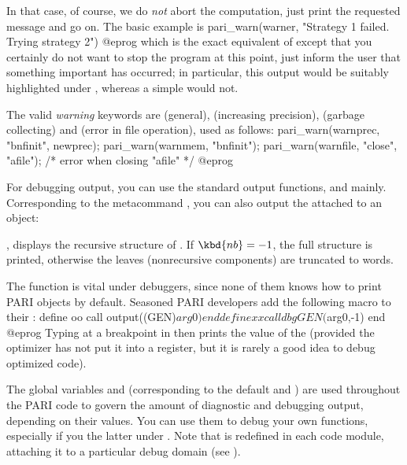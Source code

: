 In that case, of course, we do \emph{not} abort the computation, just print
the requested message and go on. The basic example is
%
\bprog
    pari_warn(warner, "Strategy 1 failed. Trying strategy 2")
@eprog\noindent
which is the exact equivalent of  except that
you certainly do not want to stop the program at this point, just inform the
user that something important has occurred; in particular, this output would be
suitably highlighted under , whereas a simple  would not.

The valid \emph{warning} keywords are  (general), 
(increasing precision),  (garbage collecting) and 
(error in file operation), used as follows:
\bprog
    pari_warn(warnprec, "bnfinit", newprec);
    pari_warn(warnmem,  "bnfinit");
    pari_warn(warnfile, "close", "afile");  /* error when closing "afile" */
@eprog

\label{se:dbg_output}

For debugging output, you can use the standard output
functions,  and  mainly. Corresponding to the
 metacommand , you can also output the  attached to an object:

, displays the recursive structure of
. If $\kbd{nb} = -1$, the full structure is printed, otherwise
the leaves (nonrecursive components) are truncated to  words.

\noindent The function  is vital under debuggers, since none of
them knows how to print PARI objects by default. Seasoned PARI developers
add the following  macro to their :
\bprog
  define oo
    call output((GEN)$arg0)
  end
  define xx
    call dbgGEN($arg0,-1)
  end
@eprog\noindent
Typing  at a breakpoint in  then prints the value of the
  (provided the optimizer has not put it into a register, but
it is rarely a good idea to debug optimized code).

\noindent
The global variables  and  (corresponding
to the default  and )
are used throughout the PARI code to govern the amount of diagnostic and
debugging output, depending on their values. You can use them to debug your
own functions, especially if you  the latter under .
Note that  is redefined in each code module, attaching it to
a particular debug domain (see ).

